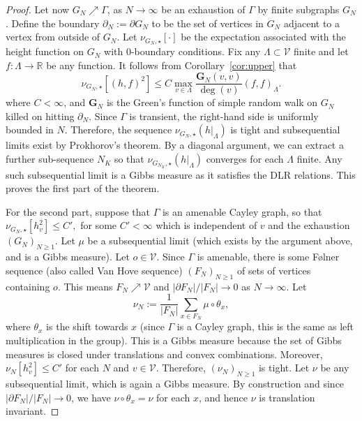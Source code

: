 \documentclass[11pt, reqno]{amsart}
\numberwithin{equation}{section}
\theoremstyle{definition}
\theoremstyle{remark}
\newcommand{\PP}{\nu}
\newcommand{\E}{\nu}
\newcommand{\RR}{\mathbb{R}}
\renewcommand{\c}[1]{\ensuremath{\mathcal{#1}}}
\newcommand{\Green}{\ensuremath{\mathbf{G}}}
\newcommand{\exact}{\star}
\begin{document}
\begin{proof}
Let now $G_N\nearrow \Gamma$, as $N\to \infty$ be an exhaustion of $\Gamma$ by finite subgraphs $G_N$. 
Define the boundary $\partial_N := \partial G_N$ to be the set of vertices in $ G_N$ adjacent to a vertex from outside of $ G_N$.
Let $\E_{G_N, \exact}[\cdot]$ be the expectation associated with the height function on $ G_N$ with $0$-boundary conditions. 
Fix any $\Lambda \subset \c{V}$ finite and let $f: \Lambda \to \RR$ be any function.
It follows from Corollary~\ref{cor:upper} that 
\[
	\E_{G_N,\exact}[(h, f)^2] \leq C \max_{v \in \Lambda} \frac{\Green_{N} (v,v)}{\deg(v)} (f, f)_{\Lambda}. 
\]
where $C < \infty$, and $\Green_N$ is the Green's function of simple random walk on $G_N$ killed on hitting $\partial_N$. 
Since $\Gamma$ is transient, the right-hand side is uniformly bounded in $N$. 
Therefore, the sequence $\PP_{G_N, \exact}(h |_{\Lambda})$ is tight and subsequential limits exist by Prokhorov's theorem. 
By a diagonal argument, we can extract a further sub-sequence $N_K$ so that $\PP_{G_{N_K}, \exact}(h|_{\Lambda})$ converges for each
$\Lambda$ finite. 
Any such subsequential limit is a Gibbs measure as it satisfies the DLR relations. 
This proves the first part of the theorem. 

For the second part, suppose that $\Gamma$ is an amenable Cayley graph, 
so that 
\(
	\E_{G_N, \exact}[h_v^2] \leq C',
\)
for some $C' < \infty$ which is independent of $v$ and the exhaustion $(G_N)_{N\geq 1}$. 
Let $\mu$ be a subsequential limit (which exists by the argument above, and is a Gibbs measure). 
Let $o \in \mathscr V$. Since $\Gamma$ is amenable, there is some F\o lner sequence (also called Van Hove sequence) $(F_N)_{N \geq 1}$ {of sets of vertices} containing $o$. 
This means $F_N \nearrow \mathscr V$ and $|\partial F_N| / |F_N| \to 0$ as $N \to \infty$. 
Let
\[
	\nu_N := \frac{1}{|F_N|} \sum_{x \in F_N} \mu \circ \theta_x, 
\]
where $\theta_x$ is the shift towards $x$ (since $\Gamma$ is a Cayley graph, this is the same as left multiplication in the group).
This is a Gibbs measure because the set of Gibbs measures is closed under translations and convex combinations. 
Moreover, $\nu_N[h_v^2] \leq C'$ for each $N$ and $v \in \mathscr V$. Therefore, $(\nu_N)_{N\geq 1}$ is tight. 
Let $\nu$ be any subsequential limit, which is again a Gibbs measure. 
By construction and since $|\partial F_N| / |F_N| \to 0$, we have $\nu \circ \theta_x = \nu$ for each $x$, and hence $\nu$ is translation invariant.
\end{proof}
\end{document}
